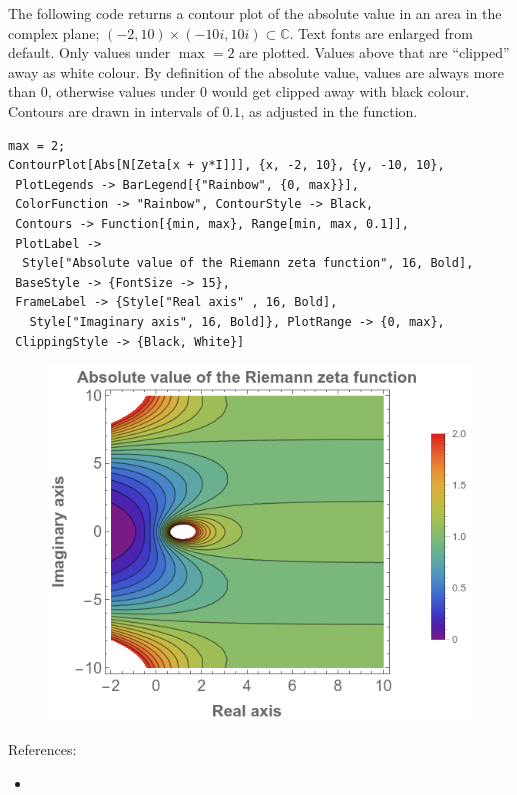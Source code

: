 \documentclass{article}
\begin{document}
The following code returns a contour plot of the  absolute value in an area in the complex plane; $(-2,10) \times(-10i, 10i) \subset \mathbb{C}.$ Text fonts are enlarged from default. Only values under $\max = 2$ are plotted. Values above that are ``clipped'' away as white colour. By definition of the absolute value, values are always more than $0$, otherwise values under $0$ would get clipped away with black colour. Contours are drawn in intervals of $0.1$, as adjusted in the  function.
\begin{verbatim}
max = 2;
ContourPlot[Abs[N[Zeta[x + y*I]]], {x, -2, 10}, {y, -10, 10}, 
 PlotLegends -> BarLegend[{"Rainbow", {0, max}}], 
 ColorFunction -> "Rainbow", ContourStyle -> Black, 
 Contours -> Function[{min, max}, Range[min, max, 0.1]], 
 PlotLabel -> 
  Style["Absolute value of the Riemann zeta function", 16, Bold], 
 BaseStyle -> {FontSize -> 15}, 
 FrameLabel -> {Style["Real axis" , 16, Bold], 
   Style["Imaginary axis", 16, Bold]}, PlotRange -> {0, max}, 
 ClippingStyle -> {Black, White}]
\end{verbatim}


\begin{figure}
  \includegraphics[width=\linewidth]{zeta.png}
\end{figure}



References:
\begin{itemize}
  \item {}
\end{itemize}


\end{document}
